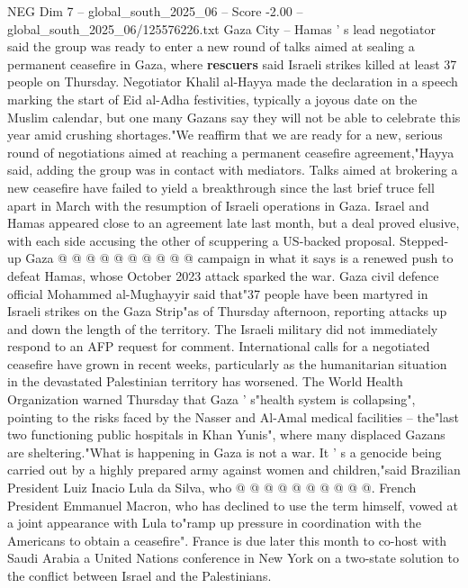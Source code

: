 \begin{textsample}{NEG Dim 7 – global\_south\_2025\_06 – Score -2.00 – global\_south\_2025\_06/125576226.txt}  \label{ex:f7_neg_057}
Gaza City -- Hamas ' s lead negotiator said the group was ready to enter a new round of talks aimed at sealing a permanent ceasefire in Gaza, where \textbf{rescuers} said Israeli strikes killed at least 37 people on Thursday.
Negotiator Khalil al-Hayya made the declaration in a speech marking the start of Eid al-Adha festivities, typically a joyous date on the Muslim calendar, but one many Gazans say they will not be able to celebrate this year amid crushing shortages."We reaffirm that we are ready for a new, serious round of negotiations aimed at reaching a permanent ceasefire agreement,"Hayya said, adding the group was in contact with mediators.
Talks aimed at brokering a new ceasefire have failed to yield a breakthrough since the last brief truce fell apart in March with the resumption of Israeli operations in Gaza.
Israel and Hamas appeared close to an agreement late last month, but a deal proved elusive, with each side accusing the other of scuppering a US-backed proposal.
Stepped-up Gaza @ @ @ @ @ @ @ @ @ @ campaign in what it says is a renewed push to defeat Hamas, whose October 2023 attack sparked the war.
Gaza civil defence official Mohammed al-Mughayyir said that"37 people have been martyred in Israeli strikes on the Gaza Strip"as of Thursday afternoon, reporting attacks up and down the length of the territory.
The Israeli military did not immediately respond to an AFP request for comment.
International calls for a negotiated ceasefire have grown in recent weeks, particularly as the humanitarian situation in the devastated Palestinian territory has worsened.
The World Health Organization warned Thursday that Gaza ' s"health system is collapsing", pointing to the risks faced by the Nasser and Al-Amal medical facilities -- the"last two functioning public hospitals in Khan Yunis", where many displaced Gazans are sheltering."What is happening in Gaza is not a war.
It ' s a genocide being carried out by a highly prepared army against women and children,"said Brazilian President Luiz Inacio Lula da Silva, who @ @ @ @ @ @ @ @ @ @.
French President Emmanuel Macron, who has declined to use the term himself, vowed at a joint appearance with Lula to"ramp up pressure in coordination with the Americans to obtain a ceasefire".
France is due later this month to co-host with Saudi Arabia a United Nations conference in New York on a two-state solution to the conflict between Israel and the Palestinians.

\end{textsample}
